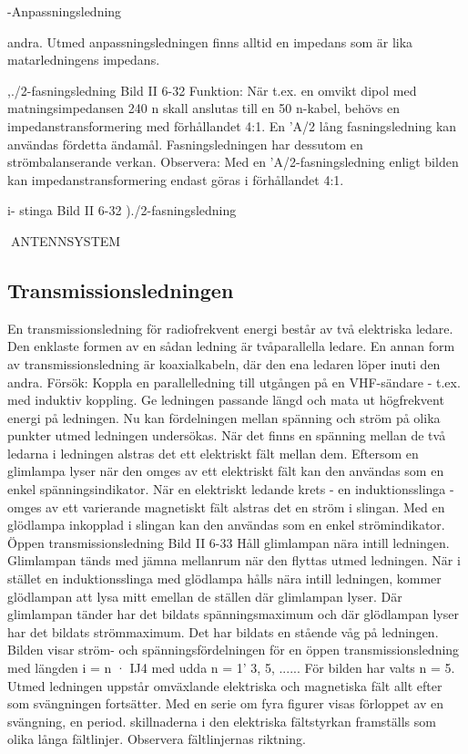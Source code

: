 {{-Anpassningsledning

andra. Utmed anpassningsledningen finns
alltid en impedans som är lika matarledningens impedans.

,./2-fasningsledning
Bild II 6-32
Funktion: När t.ex. en omvikt dipol med
matningsimpedansen 240 n skall anslutas
till en 50 n-kabel, behövs en impedanstransformering med förhållandet 4:1. En 'A/2
lång fasningsledning kan användas fördetta
ändamål. Fasningsledningen har dessutom
en strömbalanserande verkan.
Observera: Med en 'A/2-fasningsledning
enligt bilden kan impedanstransformering
endast göras i förhållandet 4:1.

i- stinga
Bild II 6-32 )./2-fasningsledning

ANTENNSYSTEM
\subsection{Transmissionsledningen}

En transmissionsledning för radiofrekvent energi består av två elektriska ledare.
Den enklaste formen av en sådan ledning är
tvåparallella ledare. En annan form av transmissionsledning är koaxialkabeln, där den
ena ledaren löper inuti den andra.
Försök: Koppla en parallelledning till utgången på en VHF-sändare - t.ex. med
induktiv koppling. Ge ledningen passande
längd och mata ut högfrekvent energi på
ledningen. Nu kan fördelningen mellan spänning och ström på olika punkter utmed ledningen undersökas. När det finns en spänning mellan de två ledarna i ledningen alstras det ett elektriskt fält mellan dem.
Eftersom en glimlampa lyser när den
omges av ett elektriskt fält kan den användas som en enkel spänningsindikator.
När en elektriskt ledande krets - en induktionsslinga - omges av ett varierande
magnetiskt fält alstras det en ström i slingan.
Med en glödlampa inkopplad i slingan kan
den användas som en enkel strömindikator.
Öppen transmissionsledning
Bild II 6-33
Håll glimlampan nära intill ledningen.
Glimlampan tänds med jämna mellanrum
när den flyttas utmed ledningen.
När i stället en induktionsslinga med glödlampa hålls nära intill ledningen, kommer
glödlampan att lysa mitt emellan de ställen
där glimlampan lyser. Där glimlampan tänder har det bildats spänningsmaximum och
där glödlampan lyser har det bildats strömmaximum. Det har bildats en stående våg
på ledningen.
Bilden visar ström- och spänningsfördelningen för en öppen transmissionsledning med längden i = n · IJ4 med udda n =
1' 3, 5, ......
För bilden har valts n = 5.
Utmed ledningen uppstår omväxlande
elektriska och magnetiska fält allt efter som
svängningen fortsätter. Med en serie om
fyra figurer visas förloppet av en svängning,
en period. skillnaderna i den elektriska fältstyrkan framställs som olika långa fältlinjer.
Observera fältlinjernas riktning.

}}
